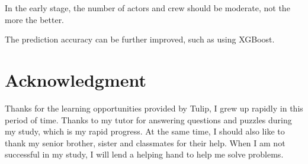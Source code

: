 In the early stage, the number of actors and crew should be moderate, not the more the better.

The prediction accuracy can be further improved, such as using XGBoost.
\section*{Acknowledgment}

Thanks for the learning opportunities provided by Tulip, 
I grew up rapidly in this period of time. 
Thanks to my tutor for answering questions and puzzles during my study, 
which is my rapid progress. At the same time, I should also like to thank my senior brother, 
sister and classmates for their help. When I am not successful in my study, 
I will lend a helping hand to help me solve problems.